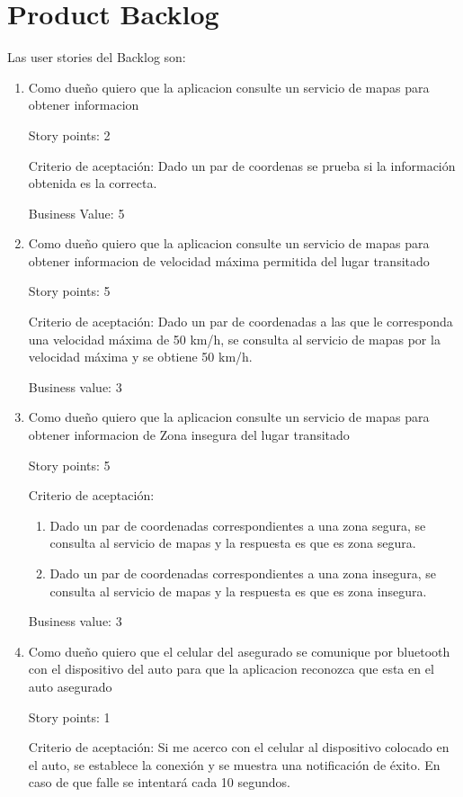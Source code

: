 \section{Product Backlog}

Las user stories del Backlog son:
\begin{enumerate}

\item Como dueño quiero que la aplicacion consulte un servicio de mapas para obtener informacion

Story points: 2

Criterio de aceptación:
Dado un par de coordenas se prueba si la información obtenida es la correcta.

Business Value: 5

\item Como dueño quiero que la aplicacion consulte un servicio de mapas para obtener informacion de velocidad máxima permitida del lugar transitado

Story points: 5

Criterio de aceptación:
Dado un par de coordenadas a las que le corresponda una velocidad máxima de 50 km/h, se consulta al servicio de mapas por la velocidad máxima y se obtiene 50 km/h.

Business value: 3

\item Como dueño quiero que la aplicacion consulte un servicio de mapas para obtener informacion de Zona insegura del lugar transitado

Story points: 5

Criterio de aceptación:
\begin{enumerate}
	\item Dado un par de coordenadas correspondientes a una zona segura, se consulta al servicio de mapas y la respuesta es que es zona segura.
	\item Dado un par de coordenadas correspondientes a una zona insegura, se consulta al servicio de mapas y la respuesta es que es zona insegura.
\end{enumerate}

Business value: 3

\item Como dueño quiero que el celular del asegurado se comunique por bluetooth con el dispositivo del auto para que la aplicacion reconozca que esta en el auto asegurado

Story points: 1

Criterio de aceptación:
Si me acerco con el celular al dispositivo colocado en el auto, se establece la conexión y se muestra una notificación de éxito. En caso de que falle se intentará cada 10 segundos.


\end{enumerate}
